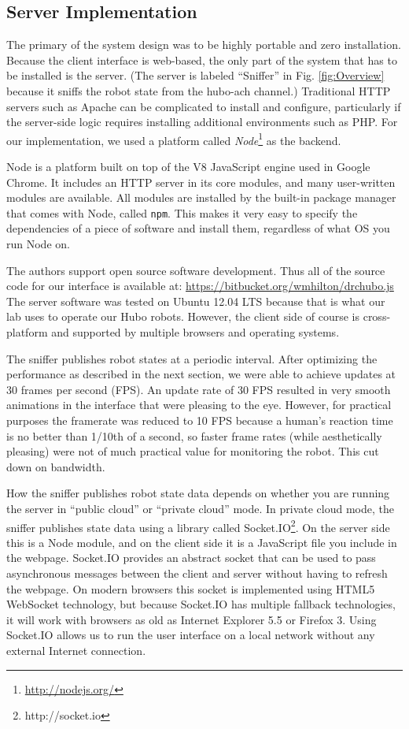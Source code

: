 \documentclass[letterpaper, 10 pt, conference]{ieee/ieeeconf}  %
\begin{document}
\subsection{Server Implementation}
The primary of the system design was to be highly portable and zero installation.
Because the client interface is web-based, the only part of the system that has to be installed is the server.
(The server is labeled ``Sniffer'' in Fig. \ref{fig:Overview} because it sniffs the robot state from the hubo-ach channel.)
Traditional HTTP servers such as Apache can be complicated to install and configure, particularly if the server-side logic requires installing additional environments such as PHP.
For our implementation, we used a platform called \textit{Node}\footnote{\url{http://nodejs.org/}} as the backend.

Node is a platform built on top of the V8 JavaScript engine used in Google Chrome.
It includes an HTTP server in its core modules, and many user-written modules are available.
All modules are installed by the built-in package manager that comes with Node, called \texttt{npm}.
This makes it very easy to specify the dependencies of a piece of software and install them, regardless of what OS you run Node on.

The authors support open source software development.
Thus all of the source code for our interface is available at: \url{https://bitbucket.org/wmhilton/drchubo.js}
The server software was tested on Ubuntu 12.04 LTS because that is what our lab uses to operate our Hubo robots.
However, the client side of course is cross-platform and supported by multiple browsers and operating systems.

The sniffer publishes robot states at a periodic interval.
After optimizing the performance as described in the next section, we were able to achieve updates at 30 frames per second (FPS).
An update rate of 30 FPS resulted in very smooth animations in the interface that were pleasing to the eye.
However, for practical purposes the framerate was reduced to 10 FPS because a human's reaction time is no better than 1/10th of a second, so faster frame rates (while aesthetically pleasing) were not of much practical value for monitoring the robot. \cite{kosinski2008literature}
This cut down on bandwidth.

How the sniffer publishes robot state data depends on whether you are running the server in ``public cloud'' or ``private cloud'' mode.
In private cloud mode, the sniffer publishes state data using a library called Socket.IO\footnote{http://socket.io}.
On the server side this is a Node module, and on the client side it is a JavaScript file you include in the webpage.
Socket.IO provides an abstract socket that can be used to pass asynchronous messages between the client and server without having to refresh the webpage.
On modern browsers this socket is implemented using HTML5 WebSocket technology, but because Socket.IO has multiple fallback technologies, it will work with browsers as old as Internet Explorer 5.5 or Firefox 3.
Using Socket.IO allows us to run the user interface on a local network without any external Internet connection.
\end{document}

